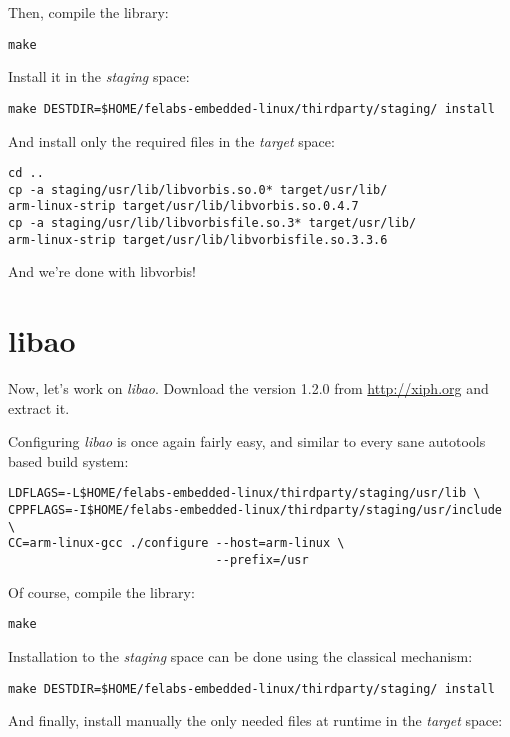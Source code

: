 Then, compile the library:

\begin{verbatim}
make
\end{verbatim}

Install it in the {\em staging} space:

\begin{verbatim}
make DESTDIR=$HOME/felabs-embedded-linux/thirdparty/staging/ install
\end{verbatim}

And install only the required files in the {\em target} space:

\begin{verbatim}
cd ..
cp -a staging/usr/lib/libvorbis.so.0* target/usr/lib/
arm-linux-strip target/usr/lib/libvorbis.so.0.4.7
cp -a staging/usr/lib/libvorbisfile.so.3* target/usr/lib/
arm-linux-strip target/usr/lib/libvorbisfile.so.3.3.6
\end{verbatim}

And we're done with libvorbis!

\section{libao}

Now, let's work on {\em libao}. Download the version 1.2.0 from
\url{http://xiph.org} and extract it.

Configuring {\em libao} is once again fairly easy, and similar to
every sane autotools based build system:

\begin{verbatim}
LDFLAGS=-L$HOME/felabs-embedded-linux/thirdparty/staging/usr/lib \
CPPFLAGS=-I$HOME/felabs-embedded-linux/thirdparty/staging/usr/include \
CC=arm-linux-gcc ./configure --host=arm-linux \
                             --prefix=/usr
\end{verbatim}

Of course, compile the library:

\begin{verbatim}
make
\end{verbatim}

Installation to the {\em staging} space can be done using the
classical  mechanism:

\begin{verbatim}
make DESTDIR=$HOME/felabs-embedded-linux/thirdparty/staging/ install
\end{verbatim}

And finally, install manually the only needed files at runtime in the
{\em target} space:

